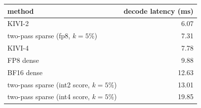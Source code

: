 \begin{tabular}{l r}
\toprule
method & decode latency (ms) \\
\midrule
KIVI-2 & 6.07 \\
two-pass sparse (fp8, $k{=}5\%$) & 7.31 \\
KIVI-4 & 7.78 \\
FP8 dense & 9.88 \\
BF16 dense & 12.63 \\
two-pass sparse (int2 score, $k{=}5\%$) & 13.01 \\
two-pass sparse (int4 score, $k{=}5\%$) & 19.85 \\
\bottomrule
\end{tabular}
